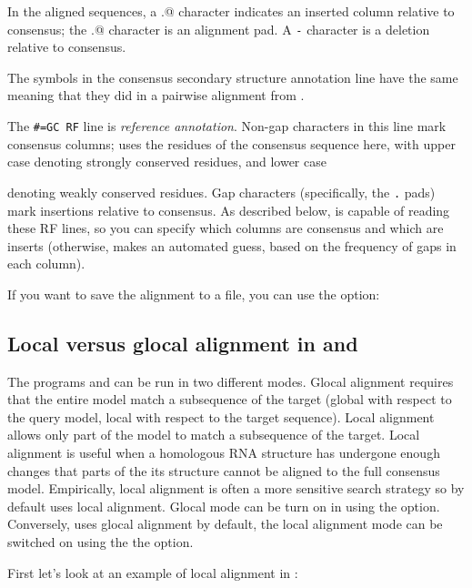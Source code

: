 In the aligned sequences, a \verb@.@ character indicates an inserted
column relative to consensus; the \verb@.@ character is an alignment
pad. A \verb+-+ character is a deletion relative to consensus.

The symbols in the consensus secondary structure annotation line have
the same meaning that they did in a pairwise alignment from
.

The {\small\verb+#=GC RF+} line is \emph{reference
annotation}. Non-gap characters in this line mark consensus columns;
 uses the residues of the consensus sequence here, with
upper case denoting strongly conserved residues, and lower case

denoting weakly conserved residues. Gap characters (specifically, the
\verb+.+ pads) mark insertions relative to consensus. As described
below,  is capable of reading these RF lines, so you can
specify which columns are consensus and which are inserts (otherwise,
 makes an automated guess, based on the frequency of
gaps in each column).

If you want to save the alignment to a file, you can use the 
option:


\subsection{Local versus glocal alignment in  and }

The programs  and  can be run in two
different modes. Glocal alignment requires that the entire model match
a subsequence of the target (global with respect to the query model,
local with respect to the target sequence). Local alignment allows
only part of the model to match a subsequence of the target. Local
alignment is useful when a homologous RNA structure has undergone
enough changes that parts of the its structure cannot be aligned to
the full consensus model. Empirically, local alignment is often a more
sensitive search strategy so by default 
 uses local alignment. Glocal mode can be turn on in
 using the  option. Conversely,  uses
glocal alignment by default, the local alignment mode can be switched
on using the the  option. 

First let's look at an example of local alignment in :

